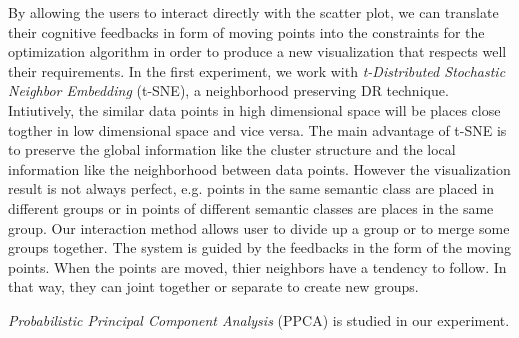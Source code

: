 By allowing the users to interact directly with the scatter plot,
we can translate their cognitive feedbacks in form of moving points into the constraints for the optimization algorithm
in order to produce a new visualization that respects well their requirements.
In the first experiment, we work with \emph{t-Distributed Stochastic Neighbor Embedding} (t-SNE), a neighborhood preserving DR technique.
Intiutively, the similar data points in high dimensional space will be places close togther in low dimensional space and vice versa.
The main advantage of t-SNE is to preserve the global information like the cluster structure and the local information like the neighborhood between data points.
However the visualization result is not always perfect, e.g. points in the same semantic class are placed in different groups or in points of different semantic classes are places in the same group.
Our interaction method allows user to divide up a group or to merge some groups together.
The system is guided by the feedbacks in the form of the moving points.
When the points are moved, thier neighbors have a tendency to follow. In that way, they can joint together or separate to create new groups.

\emph{Probabilistic Principal Component Analysis} (PPCA) is studied in our experiment.



